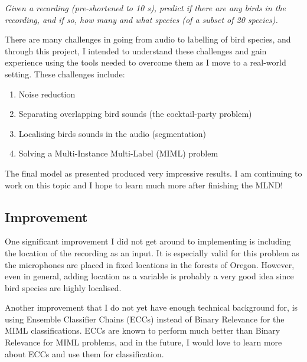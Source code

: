 \documentclass[11pt]{article}
\begin{document}
\textit{Given a recording (pre-shortened to 10 s), predict if there are any birds in the recording, and if so, how many and what species (of a subset of 20 species).}

There are many challenges in going from audio to labelling of bird species, and through this project, I intended to understand these challenges and gain experience using the tools needed to overcome them as I move to a real-world setting. These challenges include:

\begin{enumerate}
\item Noise reduction
\item Separating overlapping bird sounds (the cocktail-party problem)
\item Localising birds sounds in the audio (segmentation)
\item Solving a Multi-Instance Multi-Label (MIML) problem
\end{enumerate}

The final model as presented produced very impressive results. I am continuing to work on this topic and I hope to learn much more after finishing the MLND!

\subsection{Improvement}

One significant improvement I did not get around to implementing is including the location of the recording as an input. It is especially valid for this problem as the microphones are placed in fixed locations in the forests of Oregon. However, even in general, adding location as a variable is probably a very good idea since bird species are highly localised.

Another improvement that I do not yet have enough technical background for, is using Ensemble Classifier Chains (ECCs) instead of Binary Relevance for the MIML classifications. ECCs are known to perform much better than Binary Relevance for MIML problems, and in the future, I would love to learn more about ECCs and use them for classification.
\end{document}
